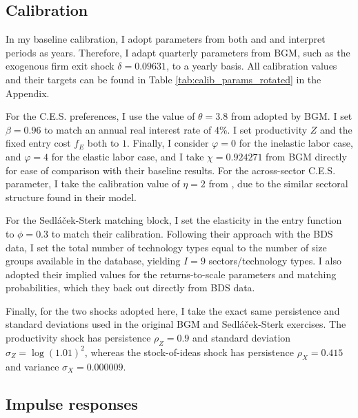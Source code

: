 \documentclass[a4paper,12pt]{article} %
\numberwithin{equation}{section} %
\numberwithin{figure}{section}
\numberwithin{table}{section}
\begin{document}
\subsection{Calibration}
\label{sec:quant-cal} 

In my baseline calibration, I adopt parameters from both \textcite{bilbiie2012endogenous} and \textcite{sedlavcek2017growth} and
interpret periods as years. Therefore, I adapt quarterly parameters from BGM, such as the exogenous firm exit shock $\delta = 0.09631$, 
to a yearly basis. All calibration values and their targets can be found in Table \ref{tab:calib_params_rotated} in the Appendix.

For the C.E.S. preferences, I use the value of $\theta = 3.8$ from \textcite{bernard2003plants} 
adopted by BGM. I set $\beta = 0.96$ to match an annual real interest rate of 4\%. I set productivity $Z$ and 
the fixed entry cost $f_E$ both to $1$. Finally, I consider $\varphi = 0$ for the inelastic labor case, 
and $\varphi = 4$ for the elastic labor case, and I take $\chi = 0.924271$ from BGM directly for ease of comparison
with their baseline results. For the across-sector C.E.S. parameter, I take the calibration value of $\eta = 2$ from
\textcite{carvalho2021sectoral}, due to the similar sectoral structure found in their model.

For the Sedláček-Sterk matching block, I set the elasticity in the entry function to $\phi = 0.3$ to match their 
calibration. Following their approach with the BDS data, I set the total number of technology types equal to the
number of size groups available in the database, yielding $I = 9$ sectors/technology types. I also adopted their
implied values for the returns-to-scale parameters and matching probabilities, which they back out directly from
BDS data. 

Finally, for the two shocks adopted here, I take the exact same persistence and standard deviations used in the 
original BGM and Sedláček-Sterk exercises. The productivity shock has
persistence $\rho_Z =0.9$ and standard deviation $\sigma_Z = \log (1.01)^2$, whereas the stock-of-ideas shock has 
persistence $\rho_X = 0.415$ and variance $\sigma_X = 0.000009$. 

\subsection{Impulse responses}
\label{sec:quant-IRF}
\end{document}
